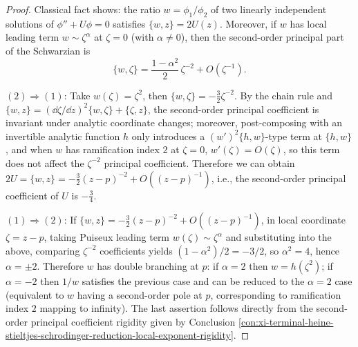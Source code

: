 \begin{proof}
Classical fact shows: the ratio \(w=\phi_1/\phi_2\) of two linearly independent solutions of \(\phi''+U\phi=0\) satisfies \(\{w,z\}=2U(z)\).
Moreover, if \(w\) has local leading term \(w\sim \zeta^{\alpha}\) at \(\zeta=0\) (with \(\alpha\neq 0\)), then the second-order principal part of the Schwarzian is
\[
\{w,\zeta\}=\frac{1-\alpha^{2}}{2}\,\zeta^{-2}+O(\zeta^{-1}).
\]
\par
\((2)\Rightarrow(1)\): Take \(w(\zeta)=\zeta^{2}\), then \(\{w,\zeta\}=-\tfrac{3}{2}\zeta^{-2}\).
By the chain rule and \(\{w,z\}=(\dd\zeta/\dd z)^2\{w,\zeta\}+\{\zeta,z\}\), the second-order principal coefficient is invariant under analytic coordinate changes;
moreover, post-composing with an invertible analytic function \(h\) only introduces a \((w')^{2}\{h,w\}\)-type term at \(\{h,w\}\), and when \(w\) has ramification index \(2\) at \(\zeta=0\), \(w'(\zeta)=O(\zeta)\), so this term does not affect the \(\zeta^{-2}\) principal coefficient.
Therefore we can obtain \(2U=\{w,z\}=-\tfrac{3}{2}(z-p)^{-2}+O((z-p)^{-1})\), i.e., the second-order principal coefficient of \(U\) is \(-\tfrac34\).
\par
\((1)\Rightarrow(2)\): If \(\{w,z\}=-\tfrac{3}{2}(z-p)^{-2}+O((z-p)^{-1})\), in local coordinate \(\zeta=z-p\), taking Puiseux leading term \(w(\zeta)\sim \zeta^{\alpha}\) and substituting into the above, comparing \(\zeta^{-2}\) coefficients yields \((1-\alpha^{2})/2=-3/2\), so \(\alpha^{2}=4\), hence \(\alpha=\pm 2\).
Therefore \(w\) has double branching at \(p\): if \(\alpha=2\) then \(w=h(\zeta^{2})\); if \(\alpha=-2\) then \(1/w\) satisfies the previous case and can be reduced to the \(\alpha=2\) case (equivalent to \(w\) having a second-order pole at \(p\), corresponding to ramification index \(2\) mapping to infinity).
The last assertion follows directly from the second-order principal coefficient rigidity given by Conclusion \ref{con:xi-terminal-heine-stieltjes-schrodinger-reduction-local-exponent-rigidity}.
\end{proof}



